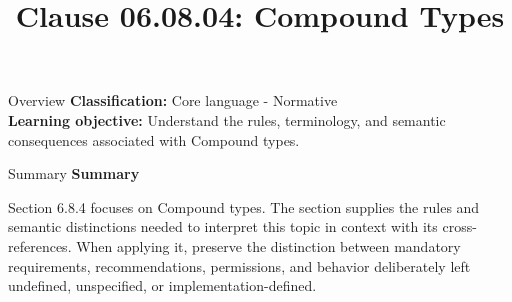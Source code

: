 \documentclass[10pt,letterpaper]{article}
\title{Clause 06.08.04: Compound Types}
\author{}
\date{}
\begin{document}
\maketitle
\begin{CornellOverviewBox}{Overview}
\textbf{Classification:} Core language - Normative\\[2pt]
\textbf{Learning objective:} Understand the rules, terminology, and semantic consequences associated with Compound types.
\end{CornellOverviewBox}\begin{CornellSummaryBox}{Summary}
{\sffamily\bfseries\color{Accent} Summary}\par\vspace{3pt}Section 6.8.4 focuses on Compound types. The section supplies the rules and semantic distinctions needed to interpret this topic in context with its cross-references. When applying it, preserve the distinction between mandatory requirements, recommendations, permissions, and behavior deliberately left undefined, unspecified, or implementation-defined.
\end{CornellSummaryBox}
\end{document}
